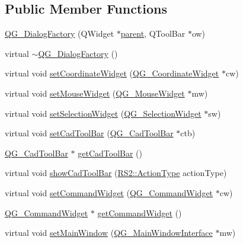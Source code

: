 \subsection*{Public Member Functions}
\begin{DoxyCompactItemize}
\item 
\hyperlink{classQG__DialogFactory_ad1878de3d60e9eb73a4955b43125a0c0}{Q\-G\-\_\-\-Dialog\-Factory} (Q\-Widget $\ast$\hyperlink{classQG__DialogFactory_a3f4a0e132723a8da0aaac5c1f8bab7dd}{parent}, Q\-Tool\-Bar $\ast$ow)
\item 
virtual \hyperlink{classQG__DialogFactory_a326c57055d3acedf93ecac55f5e2a275}{$\sim$\-Q\-G\-\_\-\-Dialog\-Factory} ()
\item 
virtual void \hyperlink{classQG__DialogFactory_a0f64a01c628a7717211ccd6ae7949427}{set\-Coordinate\-Widget} (\hyperlink{classQG__CoordinateWidget}{Q\-G\-\_\-\-Coordinate\-Widget} $\ast$cw)
\item 
virtual void \hyperlink{classQG__DialogFactory_a0943e749492fa2c6fa36d3f3548cf2be}{set\-Mouse\-Widget} (\hyperlink{classQG__MouseWidget}{Q\-G\-\_\-\-Mouse\-Widget} $\ast$mw)
\item 
virtual void \hyperlink{classQG__DialogFactory_a8eebb9437e6b87018dc6f600aed2270e}{set\-Selection\-Widget} (\hyperlink{classQG__SelectionWidget}{Q\-G\-\_\-\-Selection\-Widget} $\ast$sw)
\item 
virtual void \hyperlink{classQG__DialogFactory_adf91ee7e5942cefa4f6b780c5b3c4e1e}{set\-Cad\-Tool\-Bar} (\hyperlink{classQG__CadToolBar}{Q\-G\-\_\-\-Cad\-Tool\-Bar} $\ast$ctb)
\item 
\hyperlink{classQG__CadToolBar}{Q\-G\-\_\-\-Cad\-Tool\-Bar} $\ast$ \hyperlink{classQG__DialogFactory_afbe3a76d1327337d920808380017977c}{get\-Cad\-Tool\-Bar} ()
\item 
virtual void \hyperlink{classQG__DialogFactory_af5808e6d8f3d67c33528604df9ad022c}{show\-Cad\-Tool\-Bar} (\hyperlink{classRS2_afe3523e0bc41fd637b892321cfc4b9d7}{R\-S2\-::\-Action\-Type} action\-Type)
\item 
virtual void \hyperlink{classQG__DialogFactory_a157dfecdc6de1d72da66e607227626ca}{set\-Command\-Widget} (\hyperlink{classQG__CommandWidget}{Q\-G\-\_\-\-Command\-Widget} $\ast$cw)
\item 
\hyperlink{classQG__CommandWidget}{Q\-G\-\_\-\-Command\-Widget} $\ast$ \hyperlink{classQG__DialogFactory_a5ecabbaf7b06eed8c08d9e230fdb3198}{get\-Command\-Widget} ()
\item 
virtual void \hyperlink{classQG__DialogFactory_aa8ea27fb932e1a8279a5ecc670c759cb}{set\-Main\-Window} (\hyperlink{classQG__MainWindowInterface}{Q\-G\-\_\-\-Main\-Window\-Interface} $\ast$mw)

\end{DoxyCompactItemize}
